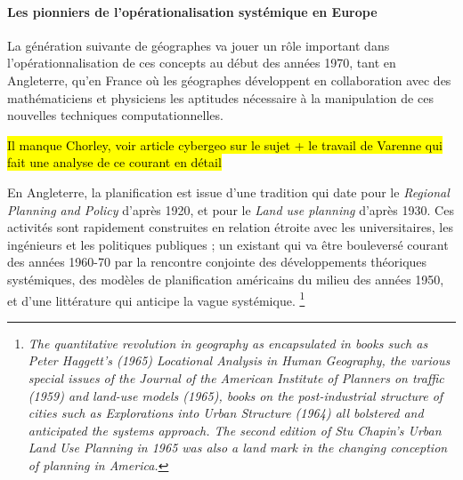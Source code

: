 \paragraph{Les pionniers de l'opérationalisation systémique en Europe}

La génération suivante de géographes va jouer un rôle important dans l'opérationnalisation de ces concepts au début des années 1970, tant en Angleterre, qu'en France où les géographes développent en collaboration avec des mathématiciens et physiciens les aptitudes nécessaire à la manipulation de ces nouvelles techniques computationnelles. \autocite{Pumain2002} 

\hl{Il manque Chorley, voir article cybergeo sur le sujet + le travail de Varenne qui fait une analyse de ce courant en détail}

En Angleterre, la planification est issue d'une tradition qui date pour le \textit{Regional Planning and Policy} d'après 1920, et pour le \textit{Land use planning} d'après 1930. Ces activités sont rapidement construites en relation étroite avec les universitaires, les ingénieurs et les politiques publiques \autocites{Bennett2003}[727]{Davies1997}; un existant qui va être bouleversé courant des années 1960-70 par la rencontre conjointe des développements théoriques systémiques, des modèles de planification américains du milieu des années 1950, et d'une littérature qui anticipe la vague systémique. \autocites[4-8]{McLoughin1985}[253]{Batty1978} \footnote{\textit{The quantitative revolution in geography as encapsulated in books such as Peter Haggett's (1965) Locational Analysis in Human Geography, the various special issues of the Journal of the American Institute of Planners on traffic (1959) and land-use models (1965), books on the post-industrial structure of cities such as Explorations into Urban Structure (1964) all bolstered and anticipated the systems approach. The second edition of Stu Chapin's Urban Land Use Planning in 1965 was also a land mark in the changing conception of planning in America.}}

